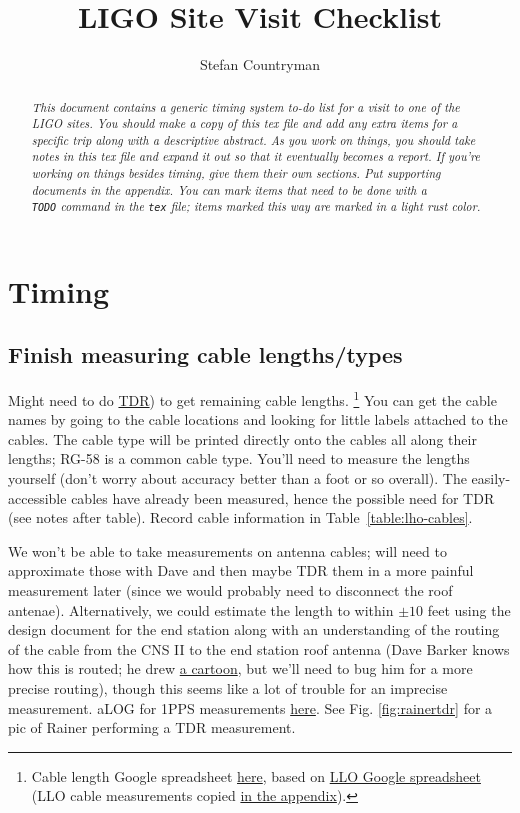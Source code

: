\documentclass{article}
\author{Stefan Countryman}
\title{LIGO Site Visit Checklist}
\newcommand*{\TODO}{\textcolor{todo}}
\begin{document}
\maketitle

\begin{abstract}
\emph{This document contains a generic timing system to-do list for a visit to one of the LIGO sites. You should make a copy of this tex file and add any extra items for a specific trip along with a descriptive abstract. As you work on things, you should take notes in this tex file and expand it out so that it eventually becomes a report. If you're working on things besides timing, give them their own sections. Put supporting documents in the appendix. You can mark items that need to be done with a \texttt{\\TODO} command in the \texttt{tex} file; items marked this way are \TODO{marked in a light rust color}.}
\end{abstract}

\section{Timing}

\TODO{
\subsection{\label{sec:cable-lengths}Finish measuring cable lengths/types}
}
Might need to do 
\href{https://en.wikipedia.org/wiki/Time-domain_reflectometer}{TDR})
to get remaining cable lengths.
\footnote{
    Cable length Google spreadsheet \href{https://docs.google.com/spreadsheets/d/1cjpBtpd4oPAfjNjBhE3RXxSx3ma3oopqLLZFMjEjc0w/edit\#gid=0}{here}, based on \href{https://docs.google.com/spreadsheets/d/1AfZ9m7Qetefmtr-PnHNARC14OWaPfn0z5c9GOvcojyA/edit\#gid=0}{LLO Google spreadsheet} (LLO cable measurements copied \hyperref[sec:llocables]{in the appendix}).
}
You can get the cable names by going to the cable locations and looking for little labels attached to the cables. The cable type will be printed directly onto the cables all along their lengths; RG-58 is a common cable type. You'll need to measure the lengths yourself (don't worry about accuracy better than a foot or so overall). The easily-accessible cables have already been measured, hence the possible need for TDR (see notes after table).
Record cable information in Table~\ref{table:lho-cables}.

We won't be able to take measurements on antenna cables; will need to approximate those with Dave and then maybe TDR them in a more painful measurement later (since we would probably need to disconnect the roof antenae). Alternatively, we could estimate the length to within $\pm10$ feet using the design document for the end station along with an understanding of the routing of the cable from the CNS II to the end station roof antenna (Dave Barker knows how this is routed; he drew 
\hyperref[fig:routing]{a cartoon}, but we'll need to bug him for a more precise routing), though this seems like a lot of trouble for an imprecise measurement. aLOG for 1PPS measurements 
\href{https://alog.ligo-wa.caltech.edu/aLOG/index.php?callRep=43185}{here}. See Fig. \ref{fig:rainertdr} for a pic of Rainer performing a TDR measurement.
\end{document}
